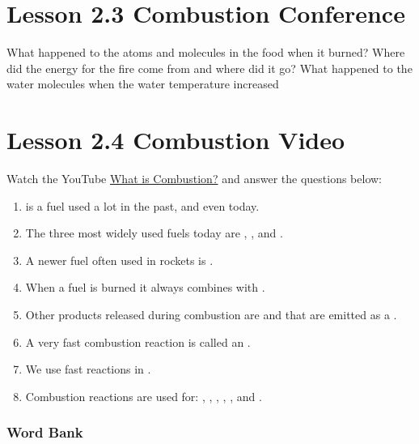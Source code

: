\documentclass[12pt]{exam}
\begin{document}
\section*{Lesson 2.3 Combustion Conference}

\begin{questions}
    \question What happened to the atoms and molecules in the food when it burned?
    \vspace{4cm}
    \question Where did the energy for the fire come from and where did it go? 
    \vspace{4cm}
    \question What happened to the water molecules when the water temperature increased
    \vspace{4cm}
\end{questions}

\newpage

\section*{Lesson 2.4 Combustion Video}

Watch the YouTube \href{https://www.youtube.com/watch?v=xd1alir07q4}{What is Combustion?} and answer the questions below:


\begin{enumerate}
    \item  \fillin[wood] is a fuel used a lot in the past, and even today.
    \item  The three most widely used fuels today are \fillin[coal], \fillin[oil], and .
    \item  A newer fuel often used in rockets is \fillin[hydrogen].
    \item  When a fuel is burned it always combines with \fillin[oxygen].
    \item  Other products released during combustion are  and \fillin[water] that are emitted as a \fillin[gas].
    \item  A very fast combustion reaction is called an \fillin[explosion].
    \item  We use fast reactions in .
    \item  Combustion reactions are used for:  \fillin[cooking], \fillin[manufacturing], , , , and \fillin[heating].
\end{enumerate}

\subsubsection*{Word Bank}
\end{document}
